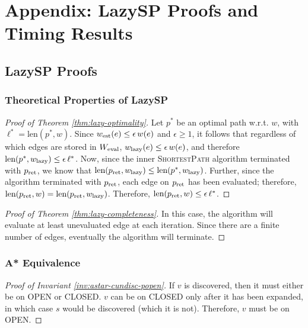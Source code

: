 \chapter{Appendix: LazySP Proofs and Timing Results}
\label{sec:appendix-proofs}

\section{LazySP Proofs}

\subsection{Theoretical Properties of LazySP}

\begin{proof}[Proof of Theorem \ref{thm:lazy-optimality}]
Let $p^*$ be an optimal path w.r.t. $w$,
with $\ell^* = \mbox{len}(p^*, w)$.
Since $w_{\mbox{\scriptsize est}}(e) \leq \epsilon \, w(e)$ and $\epsilon \geq 1$,
it follows that regardless of which edges are stored in $W_{\mbox{\scriptsize eval}}$,
$w_{\mbox{\scriptsize lazy}}(e) \leq \epsilon \, w(e)$,
and therefore
$\mbox{len}(p^*, w_{\mbox{\scriptsize lazy}}) \leq \epsilon \, \ell^*$.
Now,
since the inner \textsc{ShortestPath} algorithm terminated with
$p_{\mbox{\scriptsize ret}}$,
we know that
$\mbox{len}(p_{\mbox{\scriptsize ret}}, w_{\mbox{\scriptsize lazy}}) \leq \mbox{len}(p^*, w_{\mbox{\scriptsize lazy}})$.
Further,
since the algorithm terminated with $p_{\mbox{\scriptsize ret}}$,
each edge on $p_{\mbox{\scriptsize ret}}$ has been evaluated;
therefore,
$\mbox{len}(p_{\mbox{\scriptsize ret}}, w) = \mbox{len}(p_{\mbox{\scriptsize ret}}, w_{\mbox{\scriptsize lazy}})$.
Therefore,
$\mbox{len}(p_{\mbox{\scriptsize ret}}, w) \leq \epsilon \, \ell^*$.
\end{proof}

\begin{proof}[Proof of Theorem \ref{thm:lazy-completeness}]
In this case,
the algorithm will evaluate at least unevaluated edge at
each iteration.
Since there are a finite number of edges,
eventually the algorithm will terminate.
\end{proof}

\subsection{A* Equivalence}

\begin{proof}[Proof of Invariant \ref{inv:astar-cundisc-popen}]
If $v$ is discovered, then it must either be on OPEN or CLOSED.
$v$ can be on CLOSED only after it has been expanded,
in which case $s$ would be discovered (which it is not).
Therefore, $v$ must be on OPEN.
\end{proof}

